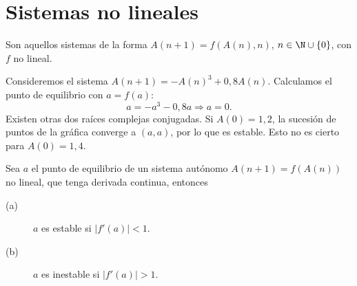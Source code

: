 \section{Sistemas no lineales}
\begin{fdefinition}[]
	\normalfont Son aquellos sistemas de la forma $\displaystyle A\left(n+1\right) = f\left(A\left(n\right), n\right) $, $\displaystyle n \in \N\cup \left\{ 0\right\}  $, con $\displaystyle f $ no lineal.
\end{fdefinition}
\begin{eg}
\normalfont Consideremos el sistema $\displaystyle A\left(n+1\right) = - A\left(n\right)^{3} + 0,8A\left(n\right) $. Calculamos el punto de equilibrio con $\displaystyle a = f\left(a\right) $:
\[a = -a^{3} -0,8a \Rightarrow a = 0 .\]
Existen otras dos raíces complejas conjugadas. Si $\displaystyle A\left(0\right) = 1,2 $, la sucesión de puntos de la gráfica converge a $\displaystyle \left(a,a\right) $, por lo que es estable. Esto no es cierto para $\displaystyle A\left(0\right)=1,4 $.
\end{eg}
\begin{ftheorem}[]
\normalfont Sea $\displaystyle a $ el punto de equilibrio de un sistema autónomo $\displaystyle A\left(n+1\right) = f\left(A\left(n\right)\right) $ no lineal, que tenga derivada continua, entonces
\begin{description}
\item[(a)] $\displaystyle a $ es estable si $\displaystyle \left|f'\left(a\right)\right| < 1 $.
\item[(b)] $\displaystyle a $ es inestable si $\displaystyle \left|f'\left(a\right)\right| > 1 $.
\end{description}
\end{ftheorem}
